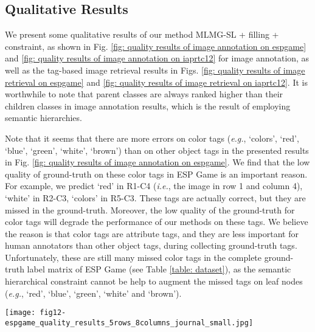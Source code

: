 \documentclass[twocolumn]{svjour3}          %
\begin{document}
\subsection{Qualitative Results}
\label{sec: subsec qualitative results}

We present some qualitative results of our method MLMG-SL + filling + constraint, as shown in Fig. \ref{fig: quality results of image annotation on espgame} and \ref{fig: quality results of image annotation on iaprtc12} for image annotation, as well as the tag-based image retrieval results in Figs. \ref{fig: quality results of image retrieval on espgame} and \ref{fig: quality results of image retrieval on iaprtc12}.
It is worthwhile to note that parent classes are always ranked higher than their children classes in image annotation results, which is the result of employing semantic hierarchies.

Note that it seems that there are more errors on color tags ({\it e.g.}, `colors', `red', `blue', `green', `white', `brown') than on other object tags in the presented results in Fig. \ref{fig: quality results of image annotation on espgame}. We find that the low quality of ground-truth on these color tags in ESP Game is an important reason. For example, we predict `red' in R1-C4 ({\it i.e.}, the image in row 1 and column 4), `white' in R2-C3, `colors' in R5-C3. These tags are actually correct, but they are missed in the ground-truth. Moreover, the low quality of the ground-truth for color tags will degrade the performance of our methods on these tags. We believe the reason is that  color tags are attribute tags, and they are less important for human annotators than other object tags, during collecting ground-truth tags. 
Unfortunately, these are still many missed color tags in the complete ground-truth label matrix of ESP Game (see Table \ref{table: dataset}), as the semantic hierarchical constraint cannot be help to augment the missed tags on leaf nodes ({\it e.g.}, `red', `blue', `green', `white' and `brown').



\begin{figure*}[phtb]
\centering
\texttt{[image: fig12-espgame\_quality\_results\_5rows\_8columns\_journal\_small.jpg]}
\vspace{-0.15in}
\caption{Some tag-based image retrieval results of MLMG-SL + filling + constraint on ESP Game.}
\label{fig: quality results of image retrieval on espgame}
\end{figure*}
\end{document}
